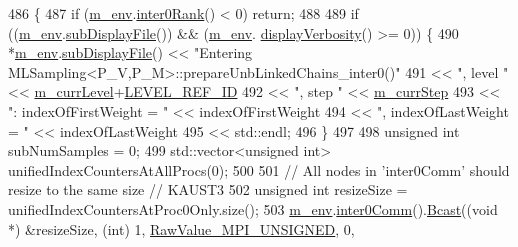 \begin{DoxyCode}
486 \{
487   \textcolor{keywordflow}{if} (\hyperlink{class_q_u_e_s_o_1_1_m_l_sampling_a13f1ca4fe9f94822fe572a743eaced1d}{m\_env}.\hyperlink{class_q_u_e_s_o_1_1_base_environment_ae106b5bb8a80b655b88b3a26b1e7c185}{inter0Rank}() < 0) \textcolor{keywordflow}{return};
488 
489   \textcolor{keywordflow}{if} ((\hyperlink{class_q_u_e_s_o_1_1_m_l_sampling_a13f1ca4fe9f94822fe572a743eaced1d}{m\_env}.\hyperlink{class_q_u_e_s_o_1_1_base_environment_a8a0064746ae8dddfece4229b9ad374d6}{subDisplayFile}()) && (\hyperlink{class_q_u_e_s_o_1_1_m_l_sampling_a13f1ca4fe9f94822fe572a743eaced1d}{m\_env}.
      \hyperlink{class_q_u_e_s_o_1_1_base_environment_a1fe5f244fc0316a0ab3e37463f108b96}{displayVerbosity}() >= 0)) \{
490     *\hyperlink{class_q_u_e_s_o_1_1_m_l_sampling_a13f1ca4fe9f94822fe572a743eaced1d}{m\_env}.\hyperlink{class_q_u_e_s_o_1_1_base_environment_a8a0064746ae8dddfece4229b9ad374d6}{subDisplayFile}() << \textcolor{stringliteral}{"Entering
       MLSampling<P\_V,P\_M>::prepareUnbLinkedChains\_inter0()"}
491                             << \textcolor{stringliteral}{", level "} << \hyperlink{class_q_u_e_s_o_1_1_m_l_sampling_af9416874c856e50f3b35270e801f17e4}{m\_currLevel}+\hyperlink{_m_l_sampling_level_options_8h_a68d15eaf394d210effcf584b938206d3}{LEVEL\_REF\_ID}
492                             << \textcolor{stringliteral}{", step "}  << \hyperlink{class_q_u_e_s_o_1_1_m_l_sampling_a1b1f8ccb4823bdfa26ec652f0807c63e}{m\_currStep}
493                             << \textcolor{stringliteral}{": indexOfFirstWeight = "} << indexOfFirstWeight
494                             << \textcolor{stringliteral}{", indexOfLastWeight = "}  << indexOfLastWeight
495                             << std::endl;
496   \}
497 
498   \textcolor{keywordtype}{unsigned} \textcolor{keywordtype}{int}              subNumSamples = 0;
499   std::vector<unsigned int> unifiedIndexCountersAtAllProcs(0);
500 
501   \textcolor{comment}{// All nodes in 'inter0Comm' should resize to the same size // KAUST3}
502   \textcolor{keywordtype}{unsigned} \textcolor{keywordtype}{int} resizeSize = unifiedIndexCountersAtProc0Only.size();
503   \hyperlink{class_q_u_e_s_o_1_1_m_l_sampling_a13f1ca4fe9f94822fe572a743eaced1d}{m\_env}.\hyperlink{class_q_u_e_s_o_1_1_base_environment_a689e4d140c74d495d97eb498714a4b82}{inter0Comm}().\hyperlink{class_q_u_e_s_o_1_1_mpi_comm_abd6af8db8b0c7fd2f5b62e26477a9537}{Bcast}((\textcolor{keywordtype}{void} *) &resizeSize, (\textcolor{keywordtype}{int}) 1, 
      \hyperlink{_mpi_comm_8h_a06cbfbc33436f6e0dc8a48ff3c49bdfc}{RawValue\_MPI\_UNSIGNED}, 0,

\end{DoxyCode}
